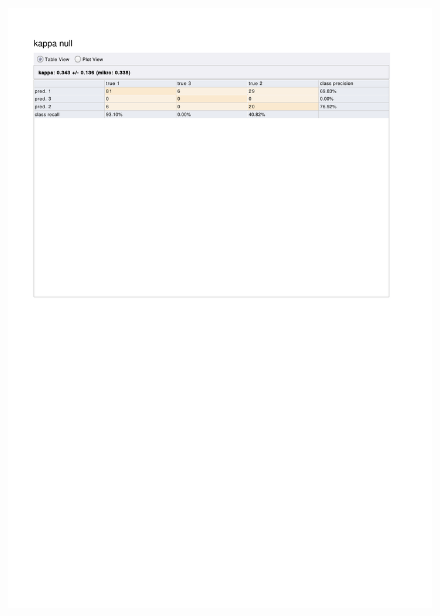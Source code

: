 \begin{figure}[htp]
  \centerline{\includegraphics[trim=0 680 0 80,clip,width=16.09cm]{results/ANN_K_Relaxation.pdf}} \caption{
} \label{ANN_K_Relaxation}
\end{figure}

\clearpage
\FloatBarrier